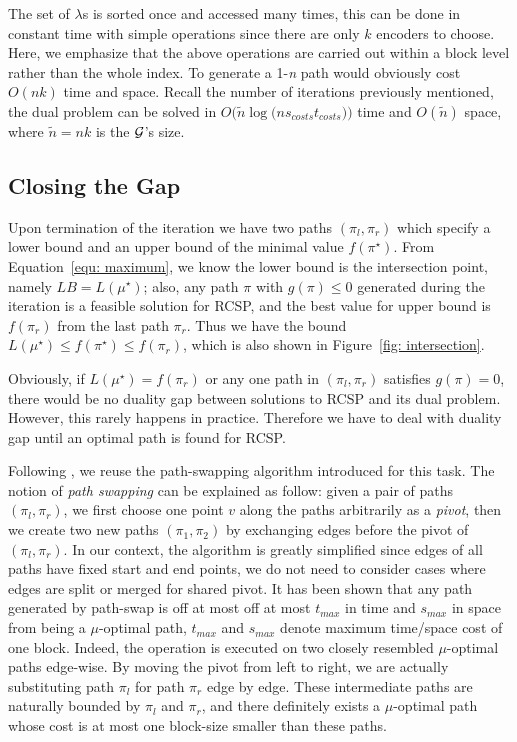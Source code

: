 \documentclass{sig-alternate-05-2015}
\begin{document}
The set of $ \lambda $s is sorted once and accessed many times, this can be done in constant time with simple operations since there are only $ k $ encoders to choose.
Here, we emphasize that the above operations are carried out within a block level rather than the whole index.
To generate a 1-\textit{n} path would obviously cost $ O(nk) $ time and space.
Recall the number of iterations previously mentioned, the dual problem can be solved in $ O(\tilde{n} $$ \log(n$$ s_{costs} $$ t_{costs})) $ time and $ O(\tilde{n}) $ space, where $ \tilde{n} = nk $ is the $ \cal G $'s size.

\subsection{Closing the Gap}
Upon termination of the iteration we have two paths $ (\pi_l,\pi_r) $ which specify a lower bound and an upper bound of the minimal value $ f(\pi^\star) $.
From Equation~\eqref{equ: maximum}, we know the lower bound is the intersection point, namely $ LB =  L(\mu^\star) $; also, any path $ \pi $ with $ g(\pi) \leqslant 0 $ generated during the iteration is a feasible solution for RCSP, and the best value for upper bound is $ f(\pi_r) $ from the last path $ \pi_r $.
Thus we have the bound $ L(\mu^\star) \leqslant f(\pi^\star) \leqslant f(\pi_r) $, which is also shown in Figure~\ref{fig: intersection}.

Obviously, if $ L(\mu^\star) = f(\pi_r) $ or any one path in $ (\pi_l,\pi_r) $ satisfies $ g(\pi) = 0 $, there would be no duality gap between solutions to RCSP and its dual problem.
However, this rarely happens in practice.
Therefore we have to deal with duality gap until an optimal path is found for RCSP.

Following \cite{farruggia2014bicriteria}, we reuse the path-swapping algorithm introduced for this task.
The notion of \textit{path swapping} can be explained as follow: given a pair of paths $ (\pi_l,\pi_r) $, we first choose one point $ v $ along the paths arbitrarily as a \textit{pivot}, then we create two new paths $ (\pi_1,\pi_2) $ by exchanging edges before the pivot of $ (\pi_l,\pi_r) $.
In our context, the algorithm is greatly simplified since edges of all paths have fixed start and end points, we do not need to consider cases where edges are split or merged for shared pivot.
It has been shown that any path generated by path-swap is off at most off at most $ t_{max} $ in time and $ s_{max} $ in space from being a $ \mu $-optimal path, $ t_{max} $ and $ s_{max} $ denote maximum time/space cost of one block.
Indeed, the operation is executed on two closely resembled $ \mu $-optimal paths edge-wise.
By moving the pivot from left to right, we are actually substituting path $ \pi_l $ for path $ \pi_r $ edge by edge.
These intermediate paths are naturally bounded by $ \pi_l $ and $ \pi_r $, and there definitely exists a $ \mu $-optimal path whose cost is at most one block-size smaller than these paths.
\end{document}
